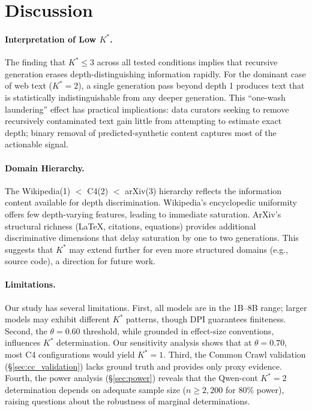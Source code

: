 \documentclass[11pt,a4paper]{article}
\newcommand{\Kstar}{K^{*}}
\begin{document}
\section{Discussion}
\label{sec:discussion}

\paragraph{Interpretation of Low $\Kstar$.}
The finding that $\Kstar \leq 3$ across all tested conditions implies that recursive generation erases depth-distinguishing information rapidly. For the dominant case of web text ($\Kstar = 2$), a single generation pass beyond depth 1 produces text that is statistically indistinguishable from any deeper generation. This ``one-wash laundering'' effect has practical implications: data curators seeking to remove recursively contaminated text gain little from attempting to estimate exact depth; binary removal of predicted-synthetic content captures most of the actionable signal.

\paragraph{Domain Hierarchy.}
The Wikipedia(1) $<$ C4(2) $<$ arXiv(3) hierarchy reflects the information content available for depth discrimination. Wikipedia's encyclopedic uniformity offers few depth-varying features, leading to immediate saturation. ArXiv's structural richness (LaTeX, citations, equations) provides additional discriminative dimensions that delay saturation by one to two generations. This suggests that $\Kstar$ may extend further for even more structured domains (e.g., source code), a direction for future work.

\paragraph{Limitations.}
Our study has several limitations. First, all models are in the 1B--8B range; larger models may exhibit different $\Kstar$ patterns, though DPI guarantees finiteness. Second, the $\theta = 0.60$ threshold, while grounded in effect-size conventions, influences $\Kstar$ determination. Our sensitivity analysis shows that at $\theta = 0.70$, most C4 configurations would yield $\Kstar = 1$. Third, the Common Crawl validation (\S\ref{sec:cc_validation}) lacks ground truth and provides only proxy evidence. Fourth, the power analysis (\S\ref{sec:power}) reveals that the Qwen-cont $\Kstar = 2$ determination depends on adequate sample size ($n \geq 2{,}200$ for 80\% power), raising questions about the robustness of marginal determinations.
\end{document}
